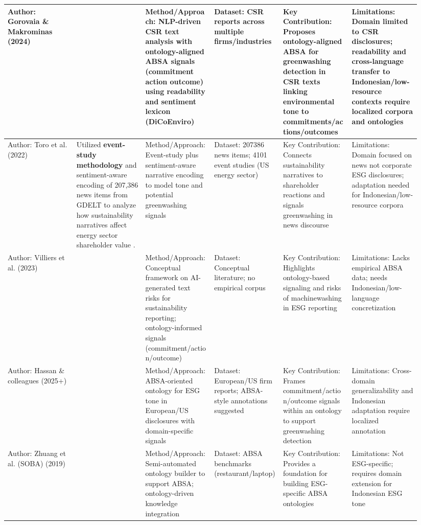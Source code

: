 \documentclass{article}
\begin{document}
\begin{landscape}
\begin{longtable}{p{0.157\linewidth} p{0.157\linewidth} p{0.157\linewidth} p{0.157\linewidth} p{0.157\linewidth} p{0.157\linewidth}}
Author: Gorovaia \& Makrominas (2024) & ~ & Method/Approach: NLP-driven CSR text analysis with ontology-aligned ABSA signals (commitment action outcome) using readability and sentiment lexicon (DiCoEnviro) & Dataset: CSR reports across multiple firms/industries & Key Contribution: Proposes ontology-aligned ABSA for greenwashing detection in CSR texts linking environmental tone to commitments/actions/outcomes & Limitations: Domain limited to CSR disclosures; readability and cross-language transfer to Indonesian/low-resource contexts require localized corpora and ontologies \\ \hline
Author: Toro et al. (2022) & Utilized \textbf{event-study methodology} and sentiment-aware encoding of 207,386 news items from GDELT to analyze how sustainability narratives affect energy sector shareholder value  \parencite{alberto_barroso_del_toro_eb0c419a}. & Method/Approach: Event-study plus sentiment-aware narrative encoding to model tone and potential greenwashing signals & Dataset: 207386 news items; 4101 event studies (US energy sector) & Key Contribution: Connects sustainability narratives to shareholder reactions and signals greenwashing in news discourse & Limitations: Domain focused on news not corporate ESG disclosures; adaptation needed for Indonesian/low-resource corpora \\ \hline
Author: Villiers et al. (2023) & ~ & Method/Approach: Conceptual framework on AI-generated text risks for sustainability reporting; ontology-informed signals (commitment/action/outcome) & Dataset: Conceptual literature; no empirical corpus & Key Contribution: Highlights ontology-based signaling and risks of machinewashing in ESG reporting & Limitations: Lacks empirical ABSA data; needs Indonesian/low-language concretization \\ \hline
Author: Hassan \& colleagues (2025+) & ~ & Method/Approach: ABSA-oriented ontology for ESG tone in European/US disclosures with domain-specific signals & Dataset: European/US firm reports; ABSA-style annotations suggested & Key Contribution: Frames commitment/action/outcome signals within an ontology to support greenwashing detection & Limitations: Cross-domain generalizability and Indonesian adaptation require localized annotation \\ \hline
Author: Zhuang et al. (SOBA) (2019) & ~ & Method/Approach: Semi-automated ontology builder to support ABSA; ontology-driven knowledge integration & Dataset: ABSA benchmarks (restaurant/laptop) & Key Contribution: Provides a foundation for building ESG-specific ABSA ontologies & Limitations: Not ESG-specific; requires domain extension for Indonesian ESG tone \\ \hline

\end{longtable}
\end{landscape}
\end{document}
